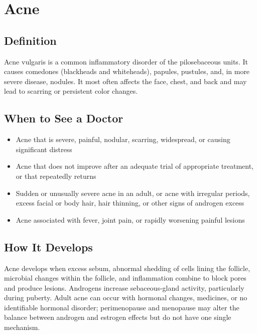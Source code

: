 \chapter{Acne}

\section*{Definition}
Acne vulgaris is a common inflammatory disorder of the pilosebaceous units. It causes comedones (blackheads and whiteheads), papules, pustules, and, in more severe disease, nodules. It most often affects the face, chest, and back and may lead to scarring or persistent color changes.

\section*{When to See a Doctor}

\begin{itemize}
 \item Acne that is severe, painful, nodular, scarring, widespread, or causing significant distress
 \item Acne that does not improve after an adequate trial of appropriate treatment, or that repeatedly returns
 \item Sudden or unusually severe acne in an adult, or acne with irregular periods, excess facial or body hair, hair thinning, or other signs of androgen excess
 \item Acne associated with fever, joint pain, or rapidly worsening painful lesions
\end{itemize}

\section*{How It Develops}
Acne develops when excess sebum, abnormal shedding of cells lining the follicle, microbial changes within the follicle, and inflammation combine to block pores and produce lesions. Androgens increase sebaceous-gland activity, particularly during puberty. Adult acne can occur with hormonal changes, medicines, or no identifiable hormonal disorder; perimenopause and menopause may alter the balance between androgen and estrogen effects but do not have one single mechanism.


